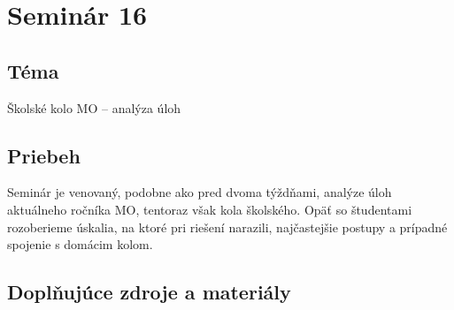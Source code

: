 \section*{Seminár 16}

\subsection*{Téma}
Školské kolo MO -- analýza úloh

\subsection*{Priebeh}

Seminár je venovaný, podobne ako pred dvoma týždňami, analýze úloh aktuálneho ročníka MO, tentoraz však kola školského. Opäť so študentami rozoberieme úskalia, na ktoré pri riešení narazili, najčastejšie postupy a prípadné spojenie s domácim kolom.

\subsection*{Doplňujúce zdroje a materiály}

